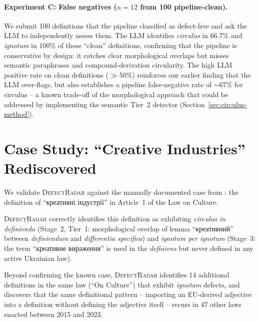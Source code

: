 \documentclass[11pt]{article}
\begin{document}
\paragraph{Experiment C: False negatives ($n=12$ from 100 pipeline-clean).}
We submit 100 definitions that the pipeline classified as defect-free and ask the LLM to independently assess them.
The LLM identifies \emph{circulus} in 66.7\% and \emph{ignotum} in 100\% of these ``clean'' definitions, confirming that the pipeline is conservative by design: it catches clear morphological overlaps but misses semantic paraphrases and compound-derivation circularity.
The high LLM positive rate on clean definitions ($\gg$50\%) reinforces our earlier finding that the LLM over-flags, but also establishes a pipeline false-negative rate of $\sim$67\% for circulus -- a known trade-off of the morphological approach that could be addressed by implementing the semantic Tier~2 detector (Section~\ref{sec:circulus-method}).

\section{Case Study: ``Creative Industries'' Rediscovered}
\label{sec:case-study}

We validate \textsc{DefectRadar} against the manually documented case from \citet{kyrychenko2026creative}: the definition of \foreignlanguage{ukrainian}{``креативні індустрії''} in Article~1 of the Law on Culture.

\textsc{DefectRadar} correctly identifies this definition as exhibiting \emph{circulus in definiendo} (Stage~2, Tier~1: morphological overlap of lemma \foreignlanguage{ukrainian}{``креативний''} between \emph{definiendum} and \emph{differentia specifica}) and \emph{ignotum per ignotum} (Stage~3: the term \foreignlanguage{ukrainian}{``креативне вираження''} is used in the \emph{definiens} but never defined in any active Ukrainian law).

Beyond confirming the known case, \textsc{DefectRadar} identifies 14 additional definitions in the same law (``On Culture'') that exhibit \emph{ignotum} defects, and discovers that the same definitional pattern -- importing an EU-derived adjective into a definition without defining the adjective itself -- recurs in 47 other laws enacted between 2015 and 2023.

\end{document}
